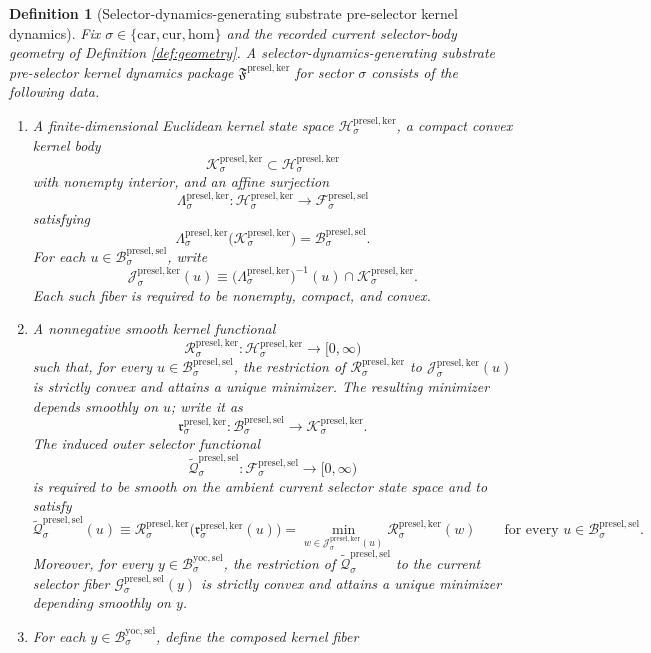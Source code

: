 \documentclass[11pt]{article}
\newcommand{\Car}{\mathrm{car}}
\newcommand{\Cur}{\mathrm{cur}}
\newcommand{\Hom}{\mathrm{hom}}
\newcommand{\YoctoSelectorBody}[1]{\mathcal B_{#1}^{\mathrm{yoc,sel}}}
\newcommand{\PreSectionSelectorSpace}[1]{\mathcal F_{#1}^{\mathrm{presel,sel}}}
\newcommand{\PreSectionSelectorBody}[1]{\mathcal B_{#1}^{\mathrm{presel,sel}}}
\newcommand{\PreSectionSelectorFiber}[2]{\mathcal G_{#1}^{\mathrm{presel,sel}}(#2)}
\newcommand{\KernelPackage}{\mathfrak F^{\mathrm{presel,ker}}}
\newcommand{\KernelSpace}[1]{\mathcal H_{#1}^{\mathrm{presel,ker}}}
\newcommand{\KernelBody}[1]{\mathcal K_{#1}^{\mathrm{presel,ker}}}
\newcommand{\KernelProj}[1]{\Lambda_{#1}^{\mathrm{presel,ker}}}
\newcommand{\KernelFiber}[2]{\mathcal J_{#1}^{\mathrm{presel,ker}}(#2)}
\newcommand{\KernelFunctional}[1]{\mathscr R_{#1}^{\mathrm{presel,ker}}}
\newcommand{\KernelMinLift}[1]{\mathfrak r_{#1}^{\mathrm{presel,ker}}}
\newcommand{\InducedSelectorFunctional}[1]{\widetilde{\mathscr Q}_{#1}^{\mathrm{presel,sel}}}
\newtheorem{definition}{Definition}
\begin{document}
\begin{definition}[Selector-dynamics-generating substrate pre-selector kernel dynamics]
\label{def:kernel}
Fix \(\sigma\in\{\Car,\Cur,\Hom\}\) and the recorded current selector-body geometry of Definition \ref{def:geometry}. A \emph{selector-dynamics-generating substrate pre-selector kernel dynamics package} \(\KernelPackage\) for sector \(\sigma\) consists of the following data.
\begin{enumerate}
    \item A finite-dimensional Euclidean kernel state space \(\KernelSpace{\sigma}\), a compact convex kernel body
    \[
    \KernelBody{\sigma}\subset\KernelSpace{\sigma}
    \]
    with nonempty interior, and an affine surjection
    \[
    \KernelProj{\sigma}:\KernelSpace{\sigma}\to\PreSectionSelectorSpace{\sigma}
    \]
    satisfying
    \[
    \KernelProj{\sigma}\bigl(\KernelBody{\sigma}\bigr)
    =
    \PreSectionSelectorBody{\sigma}.
    \]
    For each \(u\in\PreSectionSelectorBody{\sigma}\), write
    \[
    \KernelFiber{\sigma}{u}
    \equiv
    \bigl(\KernelProj{\sigma}\bigr)^{-1}(u)\cap\KernelBody{\sigma}.
    \]
    Each such fiber is required to be nonempty, compact, and convex.
    \item A nonnegative smooth kernel functional
    \[
    \KernelFunctional{\sigma}:\KernelSpace{\sigma}\to[0,\infty)
    \]
    such that, for every \(u\in\PreSectionSelectorBody{\sigma}\), the restriction of \(\KernelFunctional{\sigma}\) to \(\KernelFiber{\sigma}{u}\) is strictly convex and attains a unique minimizer. The resulting minimizer depends smoothly on \(u\); write it as
    \[
    \KernelMinLift{\sigma}:\PreSectionSelectorBody{\sigma}\to\KernelBody{\sigma}.
    \]
    The induced outer selector functional
    \[
    \InducedSelectorFunctional{\sigma}:\PreSectionSelectorSpace{\sigma}\to[0,\infty)
    \]
    is required to be smooth on the ambient current selector state space and to satisfy
    \[
    \InducedSelectorFunctional{\sigma}(u)
    \equiv
    \KernelFunctional{\sigma}\bigl(\KernelMinLift{\sigma}(u)\bigr)
    =
    \min_{w\in\KernelFiber{\sigma}{u}}
    \KernelFunctional{\sigma}(w)
    \qquad
    \text{for every }
    u\in\PreSectionSelectorBody{\sigma}.
    \]
    Moreover, for every \(y\in\YoctoSelectorBody{\sigma}\), the restriction of \(\InducedSelectorFunctional{\sigma}\) to the current selector fiber \(\PreSectionSelectorFiber{\sigma}{y}\) is strictly convex and attains a unique minimizer depending smoothly on \(y\).
    \item For each \(y\in\YoctoSelectorBody{\sigma}\), define the composed kernel fiber

\end{enumerate}
\end{definition}
\end{document}
